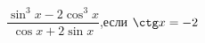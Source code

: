 \begin{ex}[type=calculate_expression]
	\begin{condition}
		\( \dfrac{\sin^3x - 2\cos^3x}{\cos x + 2\sin x} \),\quad если \( \ctg x = -2 \)
	\end{condition}
\end{ex}